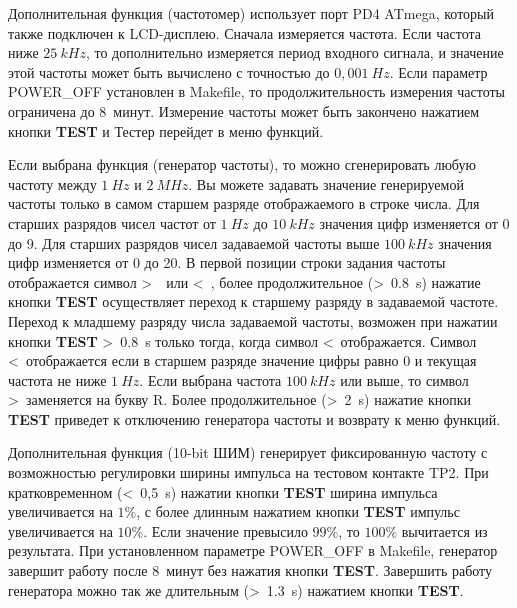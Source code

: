 \begin{description}  \setlength{\itemsep}{0em}
 \item[Frequency (частотомер)]
 Дополнительная функция  (частотомер) использует порт PD4 ATmega, который также подключен к LCD-дисплею. 
Сначала измеряется частота. Если частота ниже \(25~kHz\), то дополнительно измеряется период входного сигнала, 
и значение этой частоты может быть вычислено с точностью до \(0,001~Hz\).
Если параметр POWER\_OFF установлен в Makefile, то продолжительность измерения частоты ограничена до 8~минут. 
Измерение частоты может быть закончено нажатием кнопки \textbf{ TEST} и Тестер перейдет в меню функций.\\

 \item[f-Generator (генератор частот)]
Если выбрана функция  (генератор частоты), то можно сгенерировать любую частоту между \(1~Hz\) и \(2~MHz\).
Вы можете задавать значение генерируемой частоты только в самом старшем разряде отображаемого в строке числа.
Для старших разрядов чисел частот от \(1~Hz\) до \(10~kHz\) значения цифр изменяется от 0 до 9.
Для старших разрядов чисел задаваемой частоты выше \(100~kHz\) значения цифр изменяется от 0 до 20.
В первой позиции строки задания частоты отображается символ \textgreater~~или \textless~,
более продолжительное (\textgreater~0.8~s) нажатие кнопки \textbf{ TEST} осуществляет переход к старшему разряду
в задаваемой частоте.
Переход к младшему разряду числа задаваемой частоты, возможен при нажатии кнопки \textbf{ TEST} \textgreater~0.8~s только тогда,
когда символ \textless~отображается. Символ \textless~отображается если в старшем разряде значение цифры равно 0 и
текущая частота не ниже \(1~Hz\).
Если выбрана частота \(100~kHz\) или выше, то символ \textgreater~заменяется на букву R.
Более продолжительное (\textgreater~2~s) нажатие кнопки \textbf{ TEST} приведет к отключению генератора частоты и возврату к меню функций.\\

 \item[10-bit PWM (10-bit ШИМ)]
 Дополнительная функция  (10-bit ШИМ) генерирует фиксированную частоту с возможностью 
регулировки ширины импульса на тестовом контакте TP2.
При кратковременном (\textless~0,5~s) нажатии кнопки \textbf{ TEST} ширина импульса увеличивается на \(1 \%\), с более длинным нажатием 
кнопки \textbf{ TEST} импульс увеличивается на \(10 \%\). 
Если значение превысило \(99 \%\), то \(100 \%\) вычитается из результата.
При установленном параметре POWER\_OFF в Makefile, генератор завершит работу после 8~минут без нажатия кнопки \textbf{ TEST}.
Завершить работу генератора можно так же длительным (\textgreater~1.3~s) нажатием кнопки \textbf{ TEST}.\\


\end{description}
